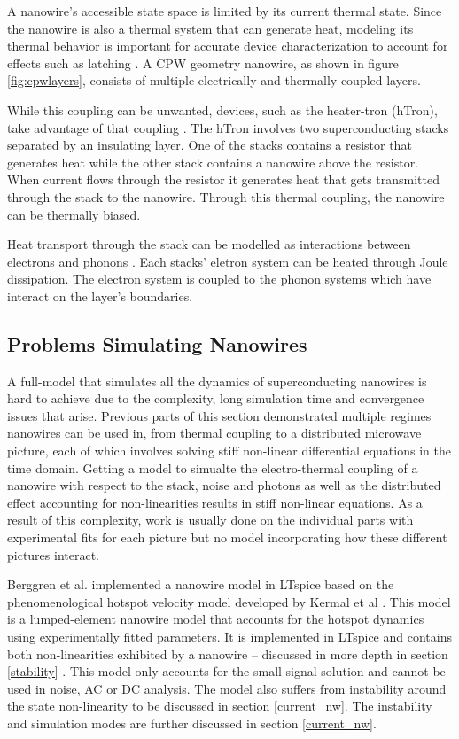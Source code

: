 A nanowire's accessible state space is limited by its current thermal state.
Since the nanowire is also a thermal system that can generate heat,
modeling its thermal behavior is important for
accurate device characterization to account for effects such as latching 
\cite{electro_thermal_modelling}.
A CPW geometry nanowire, as shown in figure \ref{fig:cpwlayers}, consists 
of multiple electrically and thermally coupled layers. 

While this coupling can be unwanted, devices, such as the heater-tron (hTron), 
take advantage of that coupling \cite{htron_paper}. 
The hTron involves two superconducting stacks separated
by an insulating layer. One of the stacks contains a resistor that generates heat while the
other stack contains a nanowire above the resistor. When current flows through the resistor
it generates heat that gets transmitted through the stack to the nanowire. Through this thermal
coupling, the nanowire can be thermally biased.

Heat transport through the stack can be modelled as interactions between electrons 
and phonons \cite{htron_paper}. Each stacks' eletron system can be heated through
Joule dissipation. The electron system is coupled to the phonon systems which
have interact on the layer's boundaries.


\subsection{Problems Simulating Nanowires}

A full-model that simulates all the dynamics of superconducting nanowires is hard to achieve
due to the complexity, long simulation time and convergence issues
that arise.
Previous parts of this section demonstrated multiple regimes nanowires can be used in,
from thermal coupling to a distributed microwave picture, each of which involves solving
stiff non-linear differential equations in the time domain. Getting a model to simualte
the electro-thermal coupling of a nanowire with respect to the stack, noise and photons
as well as the distributed effect accounting for non-linearities results in stiff non-linear
equations. 
As a result of this complexity, work is usually done on the individual parts
with experimental fits for each picture but no model incorporating how these
different pictures interact. 

Berggren et al. implemented a nanowire model in LTspice based on the phenomenological hotspot 
velocity model developed by Kermal et al \cite{karl_spice, phen_model}. 
This model is a lumped-element nanowire model that accounts 
for the hotspot dynamics using experimentally fitted parameters. It is implemented in LTspice
and contains both non-linearities exhibited by a nanowire -- discussed in more depth 
in section \ref{stability} \cite{karl_spice}. This model only 
accounts for the small signal solution and cannot be used in noise, AC or DC analysis.
The model also suffers from instability around the state non-linearity to be discussed in section \ref{current_nw}. The instability and 
simulation modes are further discussed in section \ref{current_nw}.

